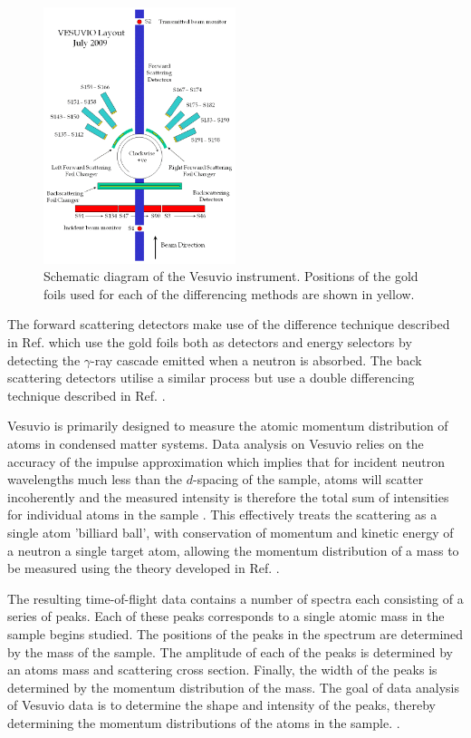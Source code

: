 \documentclass[paper=a4, fontsize=11pt]{scrartcl}	%
\numberwithin{equation}{section}															%
\numberwithin{figure}{section}																%
\numberwithin{table}{section}
\begin{document}
\begin{figure}[H]
\centering
\includegraphics[width=0.5\textwidth]{img/vesuvio-diagram.png}
\caption{Schematic diagram of the Vesuvio instrument. Positions of the gold foils used for each of the differencing methods are shown in yellow.}
\label{fig:vesuvio-diagram}
\end{figure}

The forward scattering detectors make use of the difference technique described in Ref. \cite{schooneveld2006foil} which use the gold foils both as detectors and energy selectors by detecting the $\gamma$-ray cascade emitted when a neutron is absorbed. The back scattering detectors utilise a similar process but use a double differencing technique described in Ref. \cite{seeger1985double}.

Vesuvio is primarily designed to measure the atomic momentum distribution of atoms in condensed matter systems. Data analysis on Vesuvio relies on the accuracy of the impulse approximation which implies that for incident neutron wavelengths much less than the $d$-spacing of the sample, atoms will scatter incoherently and the measured intensity is therefore the total sum of intensities for individual atoms in the sample \cite{fernandezalonso2013neutron}. This effectively treats the scattering as a single atom 'billiard ball', with conservation of momentum and kinetic energy of a neutron a single target atom, allowing the momentum distribution of a mass to be measured using the theory developed in Ref. \cite{mayers2004vesuvio}.

The resulting time-of-flight data contains a number of spectra each consisting of a series of peaks. Each of these peaks corresponds to a single atomic mass in the sample begins studied. The positions of the peaks in the spectrum are determined by the mass of the sample. The amplitude of each of the peaks is determined by an atoms mass and scattering cross section. Finally, the width of the peaks is determined by the momentum distribution of the mass. The goal of data analysis of Vesuvio data is to determine the shape and intensity of the peaks, thereby determining the momentum distributions of the atoms in the sample. \cite{mayers2010user}.
\end{document}
